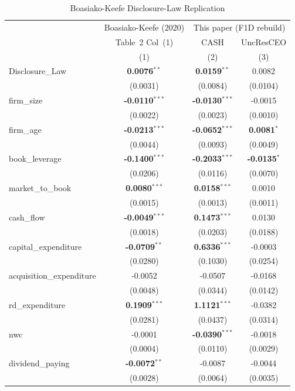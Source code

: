 \begin{table}[H]
\centering
\caption{Boasiako-Keefe Disclosure-Law Replication}
\label{tab:h1_5_disclosure_law_did}
\small
\begin{tabular}{lccc}
\toprule
 & Boasiako-Keefe (2020) & \multicolumn{2}{c}{This paper (F1D rebuild)} \\
 & Table~2 Col~(1) & CASH & UncResCEO \\
 & (1) & (2) & (3) \\
\midrule
Disclosure\_Law & \textbf{0.0076}$^{**}$ & \textbf{0.0159}$^{**}$ & 0.0082 \\
 & (0.0031) & (0.0084) & (0.0104) \\
\midrule
firm\_size & \textbf{-0.0110}$^{***}$ & \textbf{-0.0130}$^{***}$ & -0.0015 \\
 & (0.0022) & (0.0023) & (0.0010) \\
firm\_age & \textbf{-0.0213}$^{***}$ & \textbf{-0.0652}$^{***}$ & \textbf{0.0081}$^{*}$ \\
 & (0.0044) & (0.0093) & (0.0049) \\
book\_leverage & \textbf{-0.1400}$^{***}$ & \textbf{-0.2033}$^{***}$ & \textbf{-0.0135}$^{*}$ \\
 & (0.0206) & (0.0116) & (0.0070) \\
market\_to\_book & \textbf{0.0080}$^{***}$ & \textbf{0.0158}$^{***}$ & 0.0010 \\
 & (0.0015) & (0.0013) & (0.0011) \\
cash\_flow & \textbf{-0.0049}$^{***}$ & \textbf{0.1473}$^{***}$ & 0.0130 \\
 & (0.0018) & (0.0203) & (0.0188) \\
capital\_expenditure & \textbf{-0.0709}$^{**}$ & \textbf{0.6336}$^{***}$ & -0.0003 \\
 & (0.0280) & (0.1030) & (0.0254) \\
acquisition\_expenditure & -0.0052 & -0.0507 & -0.0168 \\
 & (0.0048) & (0.0344) & (0.0142) \\
rd\_expenditure & \textbf{0.1909}$^{***}$ & \textbf{1.1121}$^{***}$ & -0.0382 \\
 & (0.0281) & (0.0437) & (0.0314) \\
nwc & -0.0001 & \textbf{-0.0390}$^{***}$ & -0.0018 \\
 & (0.0004) & (0.0110) & (0.0029) \\
dividend\_paying & \textbf{-0.0072}$^{**}$ & -0.0087 & -0.0044 \\
 & (0.0028) & (0.0064) & (0.0035) \\

\end{tabular}
\end{table}
